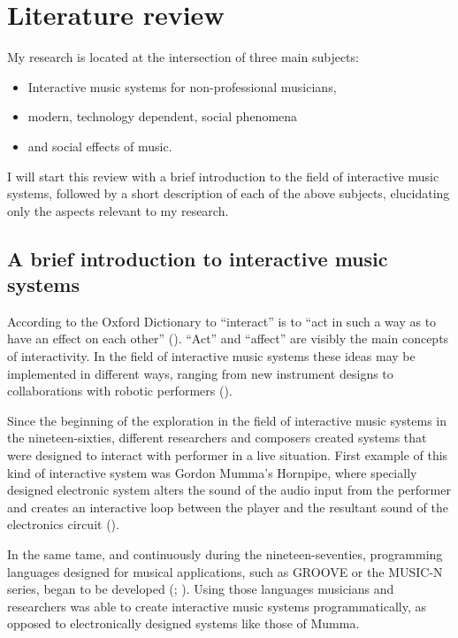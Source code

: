 \section{Literature review}

My research is located at the intersection of three main subjects:
\begin{itemize}
	\item Interactive music systems for non-professional musicians,
	\item modern, technology dependent, social phenomena
	\item and social effects of music.
\end{itemize}
I will start this review with a brief introduction to the field of interactive music systems, followed by a short description of each of the above subjects, elucidating only the aspects relevant to my research.

\subsection{A brief introduction to interactive music systems}

According to the Oxford Dictionary to ``interact'' is to ``act in such a way as to have an effect on each other'' (\cite{web:oxford}).
``Act'' and ``affect'' are visibly the main concepts of interactivity.
In the field of interactive music systems these ideas may be implemented in different ways, ranging from new instrument designs to collaborations with robotic performers (\cite{drummond09}).

Since the beginning of the exploration in the field of interactive music systems in the nineteen-sixties, different researchers and composers created systems that were designed to interact with performer in a live situation.
First example of this kind of interactive system was Gordon Mumma's Hornpipe, where specially designed electronic system alters the sound of the audio input from the performer and creates an interactive loop between the player and the resultant sound of the electronics circuit (\cite[page 12]{winkler01}).

In the same tame, and continuously during the nineteen-seventies, programming languages designed for musical applications, such as GROOVE or the MUSIC-N series, began to be developed (\cite{mathews70}; \cite{mathews69}).
Using those languages musicians and researchers was able to create interactive music systems programmatically, as opposed to electronically designed systems like those of Mumma.

